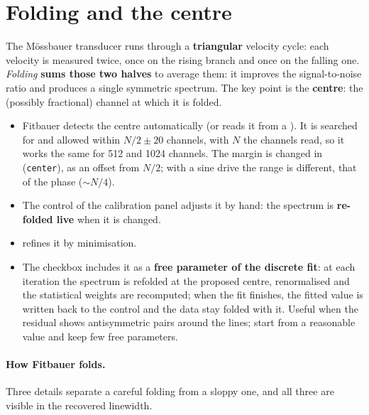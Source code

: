 \section{Folding and the centre}
\label{sec:folding}

The Mössbauer transducer runs through a \textbf{triangular} velocity cycle: each
velocity is measured twice, once on the rising branch and once on the falling
one. \emph{Folding} \textbf{sums those two halves} to average them: it improves
the signal-to-noise ratio and produces a single symmetric spectrum. The key
point is the \textbf{centre}: the (possibly fractional) channel at which it is
folded.

\begin{itemize}[nosep]
  \item Fitbauer detects the centre automatically (or reads it from a ).
        It is searched for and allowed within $N/2 \pm 20$ channels, with $N$
        the channels read, so it works the same for 512 and 1024 channels. The
        margin is changed in 
        (\texttt{center}), as an offset from $N/2$; with a sine drive the range
        is different, that of the phase ($\sim N/4$).
  \item The  control of the calibration panel adjusts it by hand:
        the spectrum is \textbf{re-folded live} when it is changed.
  \item {} refines it by minimisation.
  \item The  checkbox includes it as a
        \textbf{free parameter of the discrete fit}: at each iteration the
        spectrum is refolded at the proposed centre, renormalised and the
        statistical weights are recomputed; when the fit finishes, the fitted
        value is written back to the  control and the data stay
        folded with it. Useful when the residual shows antisymmetric pairs
        around the lines; start from a reasonable value and keep few free
        parameters.
\end{itemize}

\paragraph{How Fitbauer folds.} Three details separate a careful folding from
a sloppy one, and all three are visible in the recovered linewidth.

